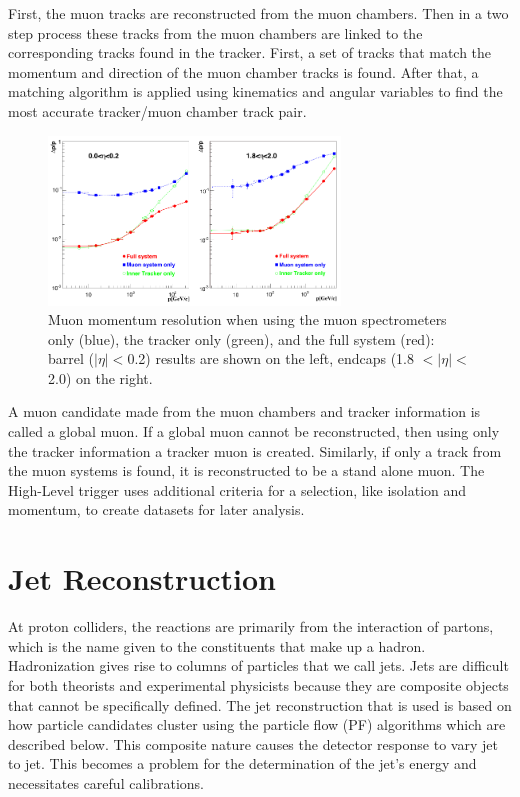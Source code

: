 First, the muon tracks are reconstructed from the muon chambers. Then in a two step process these tracks from the muon chambers are linked to the corresponding tracks found in the tracker.  First, a set of tracks that match the momentum and direction of the muon chamber tracks is found.  After that, a matching algorithm is applied using kinematics and angular variables to find the most accurate tracker/muon chamber track pair.

\begin{figure}[htb]
\centering
\includegraphics[width=0.69\textwidth]{Reconstruction/muon_Pandolfi.pdf}
\caption{Muon momentum resolution when using the muon spectrometers only (blue), the tracker only (green), and the full system (red): barrel ($|\eta| < $0.2) results are shown on the left, endcaps (1.8 $< |\eta| <$ 2.0) on the right.~\cite{Pandolfi_thesis}}
\label{fig:muon_pandolfi}
\end{figure}

A muon candidate made from the muon chambers and tracker information is called a global muon. If a global muon cannot be reconstructed, then using only the tracker information a tracker muon is created.  Similarly, if only a track from the muon systems is found, it is reconstructed to be a stand alone muon. The High-Level trigger uses additional criteria for a selection, like isolation and momentum, to create datasets for later analysis.

\section{Jet Reconstruction}

At proton colliders, the reactions are primarily from the interaction of partons, which is the name given to the constituents that make up a hadron. Hadronization gives rise to columns of particles that we call jets. Jets are difficult for both theorists and experimental physicists because they are composite objects that cannot be specifically defined.  The jet reconstruction that is used is based on how particle candidates cluster using the particle flow (PF) algorithms which are described below.  This composite nature causes the detector response to vary jet to jet. This becomes a problem for the determination of the jet's energy and necessitates careful calibrations.

